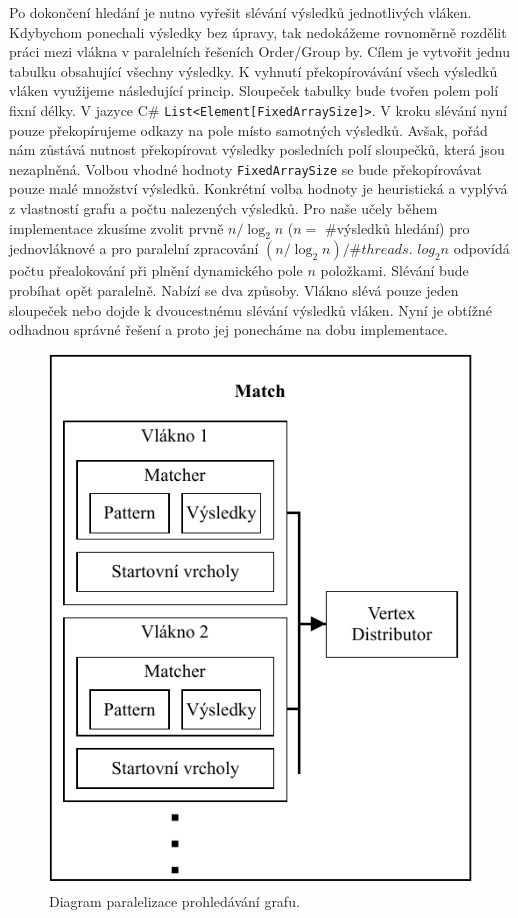 Po dokončení hledání je nutno vyřešit slévání výsledků jednotlivých vláken.
Kdybychom ponechali výsledky bez úpravy, tak nedokážeme rovnoměrně rozdělit práci mezi vlákna v paralelních řešeních Order/Group by.
Cílem je vytvořit jednu tabulku obsahující všechny výsledky.
K vyhnutí překopírovávání všech výsledků vláken využijeme následující princip.
Sloupeček tabulky bude tvořen polem polí fixní délky.
V jazyce C\# \texttt{List<Element[FixedArraySize]>}.
V kroku slévání nyní pouze překopírujeme odkazy na pole místo samotných výsledků.
Avšak, pořád nám zůstává nutnost překopírovat výsledky posledních polí sloupečků, která jsou nezaplněná.
Volbou vhodné hodnoty \texttt{FixedArraySize} se bude překopírovávat pouze malé množství výsledků.
Konkrétní volba hodnoty je heuristická a vyplývá z vlastností grafu a počtu nalezených výsledků.
Pro naše učely během implementace zkusíme zvolit prvně $n/\log_2 n$ ($n = $ \#výsledků hledání) pro jednovláknové a pro paralelní zpracování $(n/\log_2 n)/\#threads$.
$log_2 n$ odpovídá počtu přealokování při plnění dynamického pole $n$ položkami.
Slévání bude probíhat opět paralelně.
Nabízí se dva způsoby.
Vlákno slévá pouze jeden sloupeček nebo dojde k dvoucestnému slévání výsledků vláken.
Nyní je obtížné odhadnou správné řešení a proto jej ponecháme na dobu implementace.    

\clearpage

\begin{figure}[!htp]
\includegraphics{../img/diaQueryObjectsMatchPar.pdf}\centering
\caption{Diagram paralelizace prohledávání grafu.}
\label{figure.diaQueryObjectsMatchPar}
\end{figure}

